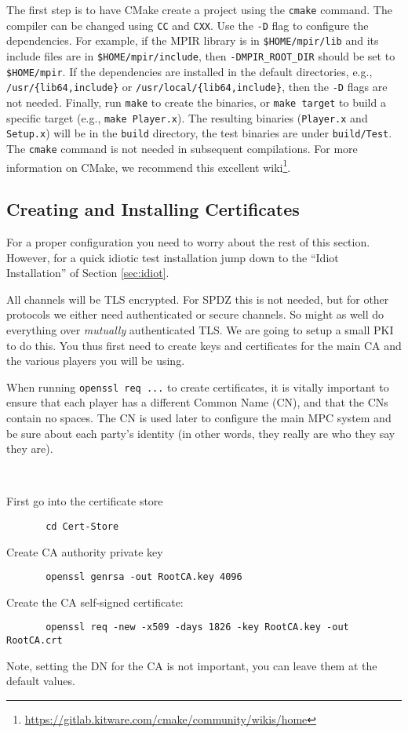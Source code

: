 The first step is to have CMake create a project using the \verb+cmake+ command.
The compiler can be changed using \verb+CC+ and \verb+CXX+.
Use the \verb+-D+ flag to configure the dependencies.
For example, if the MPIR library is in \verb+$HOME/mpir/lib+ and its include files are in \verb+$HOME/mpir/include+,
then \verb+-DMPIR_ROOT_DIR+ should be set to \verb+$HOME/mpir+.
If the dependencies are installed in the default directories,
e.g., \verb+/usr/{lib64,include}+ or \verb+/usr/local/{lib64,include}+,
then the \verb+-D+ flags are not needed.
Finally, run \verb+make+ to create the binaries, or \verb+make target+ to build a specific target (e.g., \verb+make Player.x+).
The resulting binaries (\verb+Player.x+ and \verb+Setup.x+) will be in the \verb+build+ directory,
the test binaries are under \verb+build/Test+.
The \verb+cmake+ command is not needed in subsequent compilations.
For more information on CMake, we recommend this excellent wiki\footnote{\url{https://gitlab.kitware.com/cmake/community/wikis/home}}.


\subsection{Creating and Installing Certificates}
For a proper configuration you need to worry about the rest
of this section.
However, for a quick idiotic test installation jump down to the ``Idiot
Installation'' of Section \ref{sec:idiot}.

All channels will be TLS encrypted. For SPDZ this is not needed, but for
other protocols we either need authenticated or secure channels. So might
as well do everything over {\em mutually} authenticated TLS. We are going
to setup a small PKI to do this. You thus first need to create
keys and certificates for the main CA and the various players you
will be using.

When running \verb+openssl req ...+ to create certificates, it is
vitally important to ensure that each player has a different Common
Name (CN), and that the CNs contain no spaces.  The CN is used later
to configure the main MPC system and be sure about each party's
identity (in other words, they really are who they say they are).

~~

\noindent
First go into the certificate store
\begin{verbatim}
       cd Cert-Store
\end{verbatim}
Create CA authority private key
\begin{verbatim}
       openssl genrsa -out RootCA.key 4096
\end{verbatim}
Create the CA self-signed certificate:
\begin{verbatim}
       openssl req -new -x509 -days 1826 -key RootCA.key -out RootCA.crt
\end{verbatim}
Note, setting the DN for the CA is not important, you can leave them
at the default values.

